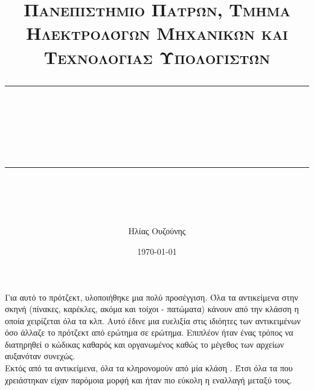 \documentclass[11pt]{scrartcl} %
\title{	
	\normalfont\normalsize
	\textsc{Πανεπιστήμιο Πατρών, Τμήμα Ηλεκτρολόγων Μηχανικών και Τεχνολογίας Υπολογιστών}\\ %
	\vspace{25pt} %
	\rule{\linewidth}{0.5pt}\\ %
	\vspace{20pt} %
	{\huge \en{ART GALLERY}}\\ %
	\vspace{12pt} %
	\rule{\linewidth}{2pt}\\ %
	\vspace{12pt} %
}
\author{\LARGE Ηλίας Ουζούνης \\ \en{up1083749}} %
\date{\normalsize\today} %
\begin{document}
\maketitle

\newpage

\tableofcontents
\newpage

\section*{}
	Για αυτό το πρότζεκτ, υλοποιήθηκε μια πολύ  προσέγγιση. Όλα τα αντικείμενα στην σκηνή (πίνακες, καρέκλες,
ακόμα και τοίχοι - πατώματα) κάνουν  από την κλάσση  η οποία χειρίζεται όλα τα 
κλπ. Αυτό έδινε μια ευελιξία στις ιδιόητες των αντικειμένων όσο άλλαζε το πρότζεκτ από ερώτημα σε ερώτημα. 
Επιπλέον ήταν ένας τρόπος να διατηρηθεί ο κώδικας καθαρός και οργανωμένος καθώς το μέγεθος των αρχείων αυξανόταν συνεχώς.\\

Εκτός από τα αντικείμενα, όλα τα  κληρονομούν από μία κλάση . Έτσι όλα τα  που χρειάστηκαν είχαν παρόμοια
μορφή και ήταν πιο εύκολη η εναλλαγή μεταξύ τους.\\

\section{}
\end{document}
